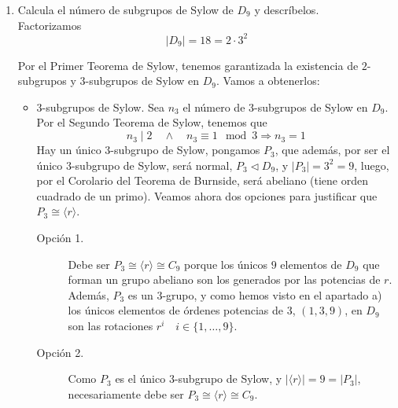 \documentclass[12pt]{article}
\begin{document}
\begin{ejercicio}[3 puntos]
\begin{enumerate}[label=(\alph*)]
            \item Calcula el número de subgrupos de Sylow de $D_9$ y descríbelos. \\
            
            Factorizamos $$|D_9| = 18 = 2 \cdot 3^2$$

            Por el Primer Teorema de Sylow, tenemos garantizada la existencia de $2$-subgrupos y $3$-subgrupos de Sylow en $D_9$. Vamos a obtenerlos:
            \begin{itemize}
                \item $3$-subgrupos de Sylow. Sea $n_3$ el número de $3$-subgrupos de Sylow en $D_9$. Por el Segundo Teorema de Sylow, tenemos que 
                $$n_3 \mid 2 \quad \land \quad n_3 \equiv 1 \mod 3 \Longrightarrow n_3 = 1$$
                Hay un único $3$-subgrupo de Sylow, pongamos $P_3$, que además, por ser el único $3$-subgrupo de Sylow, será normal, $P_3 \vartriangleleft D_9$, y $|P_3| = 3^2 = 9$, luego, por el Corolario del Teorema de Burnside, será abeliano (tiene orden cuadrado de un primo). Veamos ahora 
                dos opciones para justificar que $P_3 \cong \langle r \rangle$. \\

                \begin{description}
                    \item[Opción 1.] 
                    
                    Debe ser $P_3 \cong \langle r \rangle \cong C_9$ porque los únicos $9$ elementos de $D_9$ que forman un grupo abeliano son los generados por las potencias de $r$. Además, $P_3$ es un $3$-grupo, y como hemos visto en el apartado a) los únicos elementos de órdenes potencias de $3$, 
                    $(1,3,9)$, en $D_9$ son las rotaciones $r^{i} \quad i \in \{1, \ldots, 9\}$. \\

                    \item[Opción 2.]
                    
                    Como $P_3$ es el único $3$-subgrupo de Sylow, y $|\langle r \rangle| = 9 = |P_3|$, necesariamente debe ser $P_3 \cong \langle r \rangle \cong C_9$. \\
                \end{description}
                

\end{itemize}
\end{enumerate}
\end{ejercicio}
\end{document}
